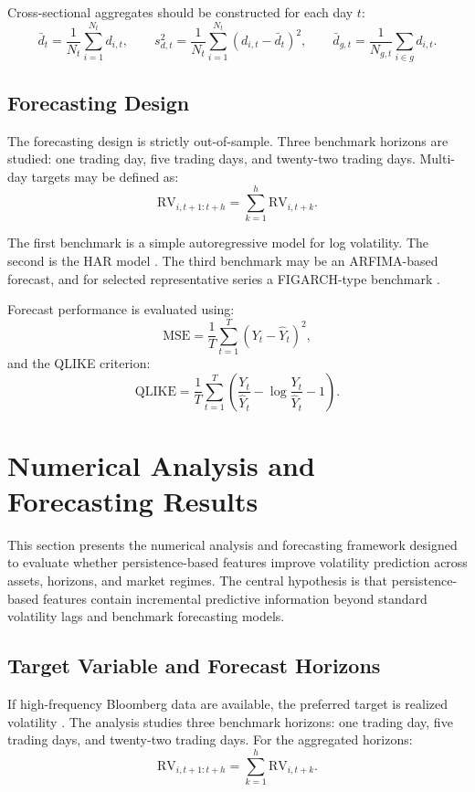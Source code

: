 \documentclass[12pt]{article}
\begin{document}
Cross-sectional aggregates should be constructed for each day $t$:
\[
\bar{d}_t = \frac{1}{N_t}\sum_{i=1}^{N_t} d_{i,t}, \qquad
s_{d,t}^2 = \frac{1}{N_t}\sum_{i=1}^{N_t}(d_{i,t} - \bar{d}_t)^2, \qquad
\bar{d}_{g,t} = \frac{1}{N_{g,t}}\sum_{i \in g} d_{i,t}.
\]

\subsection{Forecasting Design}

The forecasting design is strictly out-of-sample. Three benchmark horizons are studied: one trading day, five trading days, and twenty-two trading days. Multi-day targets may be defined as:
\[
\mathrm{RV}_{i,t+1:t+h} = \sum_{k=1}^{h} \mathrm{RV}_{i,t+k}.
\]

The first benchmark is a simple autoregressive model for log volatility. The second is the HAR model \citep{Corsi2009}. The third benchmark may be an ARFIMA-based forecast, and for selected representative series a FIGARCH-type benchmark \citep{Baillie1996, GrangerJoyeux1980, Hosking1981}.

Forecast performance is evaluated using:
\[
\mathrm{MSE} = \frac{1}{T}\sum_{t=1}^{T}(Y_t - \hat{Y}_t)^2,
\]
and the QLIKE criterion:
\[
\mathrm{QLIKE} = \frac{1}{T}\sum_{t=1}^{T}\left(\frac{Y_t}{\hat{Y}_t} - \log\frac{Y_t}{\hat{Y}_t} - 1\right).
\]

\section{Numerical Analysis and Forecasting Results}
\label{sec:results}

This section presents the numerical analysis and forecasting framework designed to evaluate whether persistence-based features improve volatility prediction across assets, horizons, and market regimes. The central hypothesis is that persistence-based features contain incremental predictive information beyond standard volatility lags and benchmark forecasting models.

\subsection{Target Variable and Forecast Horizons}

If high-frequency Bloomberg data are available, the preferred target is realized volatility \citep{Andersen2003, BarndorffNielsen2002}. The analysis studies three benchmark horizons: one trading day, five trading days, and twenty-two trading days. For the aggregated horizons:
\[
\mathrm{RV}_{i,t+1:t+h} = \sum_{k=1}^{h} \mathrm{RV}_{i,t+k}.
\]
\end{document}
